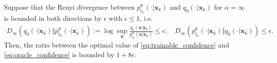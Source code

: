 \begin{theorem}
\label{thm:confidence_bounds}
    Suppose that the Renyi divergence between ${p}^\theta_{t_k}(\cdot|\bm x_k)$ and $q_0(\cdot |\bm x_k)$ for $\alpha = \infty$ is bounded in both directions by $\epsilon$ with $\epsilon \le 1$, i.e.
\begin{align*}
    D_\infty(q_0(\cdot |\bm x_k)\Vert p^\theta_{t_k}(\cdot | \bm x_k)) := \log \sup_{\bm x} \frac{q_0(\bm x|\bm x_k)}{{p}^\theta_{t_k}(\bm x|\bm x_k)} \leq \epsilon;\quad 
    D_\infty(p^\theta_{t_k}(\cdot | \bm x_k)\Vert q_0(\cdot |\bm x_k)) \leq \epsilon.
\end{align*}
Then, the ratio between the optimal value of \eqref{eq:trainable_confidence} and \eqref{eq:oracle_confidence} is bounded by $1+8\epsilon$.
\end{theorem}
\fi

